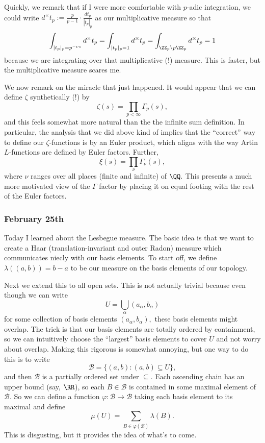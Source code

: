 Quickly, we remark that if I were more comfortable with $p$-adic integration, we could write $d^\times t_p:=\frac p{p-1}\cdot\frac{dt_p}{|t_p|_p}$ as our multiplicative measure so that
\[\int_{|t_p|_p=p^{-\nu s}}d^\times t_p=\int_{|t_p|_p=1}d^\times t_p=\int_{\ZZ_p\setminus p\ZZ_p}d^\times t_p=1\]
because we are integrating over that multiplicative (!) measure. This is faster, but the multiplicative measure scares me.

We now remark on the miracle that just happened. It would appear that we can define $\zeta$ synthetically (!) by
\[\zeta(s)=\prod_{p<\infty}\Gamma_p(s),\]
and this feels somewhat more natural than the the infinite sum definition. In particular, the analysis that we did above kind of implies that the ``correct'' way to define our $\zeta$-functions is by an Euler product, which aligns with the way Artin $L$-functions are defined by Euler factors. Further,
\[\xi(s)=\prod_\nu\Gamma_\nu(s),\]
where $\nu$ ranges over all places (finite and infinite) of $\QQ.$ This presents a much more motivated view of the $\Gamma$ factor by placing it on equal footing with the rest of the Euler factors.

\subsubsection{February 25th}
Today I learned about the Lesbegue measure. The basic idea is that we want to create a Haar (translation-invariant and outer Radon) measure which communicates niecly with our basis elements. To start off, we define $\lambda((a,b))=b-a$ to be our measure on the basis elements of our topology.

Next we extend this to all open sets. This is not actually trivial because even though we can write
\[U=\bigcup_\alpha(a_\alpha,b_\alpha)\]
for some collection of basis elements $(a_\alpha,b_\alpha),$ these basis elements might overlap. The trick is that our basis elements are totally ordered by containment, so we can intuitively choose the ``largest'' basis elements to cover $U$ and not worry about overlap. Making this rigorous is somewhat annoying, but one way to do this is to write
\[\mathcal B=\{(a,b):(a,b)\subseteq U\},\]
and then $\mathcal B$ is a partially ordered set under $\subseteq.$ Each ascending chain has an upper bound (say, $\RR$), so each $B\in\mathcal B$ is contained in some maximal element of $\mathcal B.$ So we can define a function $\varphi:\mathcal B\to\mathcal B$ taking each basis element to its maximal and define
\[\mu(U)=\sum_{B\in\varphi(\mathcal B)}\lambda(B).\]
This is disgusting, but it provides the idea of what's to come.


